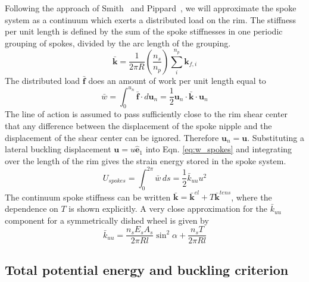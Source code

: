 \documentclass{bmd2016p}
\newcommand{\e}{\ensuremath{\hat{\bm{e}}_1}}
\begin{document}
Following the approach of Smith~\cite{Smith1901a} and Pippard~\cite{Pippard1932d}, we will approximate the spoke system as a continuum which exerts a distributed load on the rim. The stiffness per unit length is defined by the sum of the spoke stiffnesses in one periodic grouping of spokes, divided by the arc length of the grouping.
	\begin{equation}\label{eq:kbar}
	\bar{\bm{k}} = \frac{1}{2\pi R}\left(\frac{n_s}{n_p}\right) \sum_i^{n_p} \bm{k}_{f, i}
	\end{equation}
	The distributed load $\bar{\bm{f}}$ does an amount of work per unit length equal to
	\begin{equation}\label{eq:w_spokes}
	\bar{w} = \int_0^{u_n} \bar{\bm{f}} \cdot d\bm{u}_n = \frac{1}{2} \bm{u}_n \cdot \bar{\bm{k}} \cdot \bm{u}_n
	\end{equation}
The line of action is assumed to pass sufficiently close to the rim shear center that any difference between the displacement of the spoke nipple and the displacement of the shear center can be ignored. Therefore $\bm{u}_n = \bm{u}$. Substituting a lateral buckling displacement $\bm{u}=u\e$ into Eqn. \ref{eq:w_spokes} and integrating over the length of the rim gives the strain energy stored in the spoke system.
	\begin{equation}\label{eq:Us}
	U_{spokes} = \int_0^{2\pi} \bar{w} \, ds = \frac{1}{2} \bar{k}_{uu}u^2
	\end{equation}
The continuum spoke stiffness can be written $\bar{\bm{k}} = \bar{\bm{k}}^{el} + T\bar{\bm{k}}^{tens}$, where the dependence on $T$ is shown explicitly. A very close approximation for the $\bar{k}_{uu}$ component for a symmetrically dished wheel is given by
	\begin{equation}\label{eq:kuu}
	\bar{k}_{uu} = \frac{n_sE_sA_s}{2\pi Rl}\sin^2{\alpha} + \frac{n_s T}{2\pi Rl}
	\end{equation}


\subsection{Total potential energy and buckling criterion}
\end{document}
